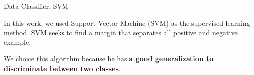 \documentclass{beamer}
\begin{document}
\begin{frame}{Data Classifier: SVM}
\begin{block}{}
	In this work, we used Support Vector Machine (SVM) as the supervised learning method. SVM seeks to find a margin that separates all positive and negative example.
		
	We choice this algorithm because he has \textbf{a good generalization to discriminate between two classes}.
\end{block}
\end{frame}


\end{document}
